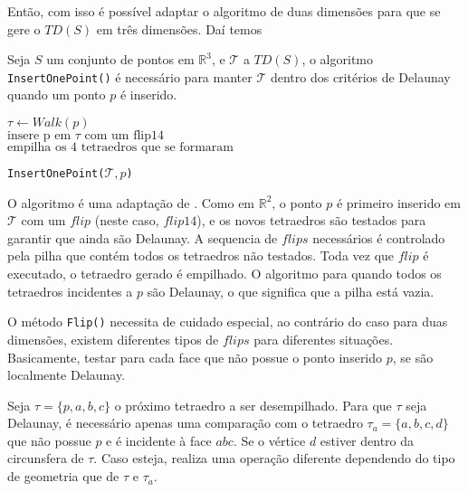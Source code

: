 Então, com isso é possível adaptar o algoritmo de duas dimensões para que 
se gere o $TD(S)$ em três dimensões. Daí temos 
\begin{definicao}
    Seja $S$ um conjunto de pontos em $\mathbb{R}^3$, e $\mathcal{T}$ a $TD(S)$,
    o algoritmo \texttt{InsertOnePoint()} é necessário para manter $\mathcal{T}$
    dentro dos critérios de Delaunay quando um ponto $p$ é inserido.    
\end{definicao}

\begin{algorithm}
\DontPrintSemicolon %
$\tau \gets Walk(p)$\\
$\text{insere p em }\tau\text{ com um flip14}$\\
$\text{empilha os 4 tetraedros que se formaram}$\\
\caption{\texttt{InsertOnePoint($\mathcal{T}, p$)}}
\label{alg1}
\end{algorithm}

O algoritmo é uma adaptação de \cite{Joe1991}. Como em $\mathbb{R}^2$, o ponto $p$
é primeiro inserido em $\mathcal{T}$ com um $flip$ (neste caso, $flip14$), e os 
novos tetraedros são testados para garantir que ainda são Delaunay. A sequencia de 
$flips$ necessários é controlado pela pilha que contém todos os tetraedros não
testados. Toda vez que $flip$ é executado, o tetraedro gerado é empilhado. O algoritmo
para quando todos os tetraedros incidentes a $p$ são Delaunay, o que significa que 
a pilha está vazia.

O método \texttt{Flip()} necessita de cuidado especial, ao contrário do caso para duas
dimensões, existem diferentes tipos de $flips$ para diferentes situações. Basicamente,
testar para cada face que não possue o ponto inserido $p$, se são localmente 
Delaunay.  

Seja $\tau = \{p,a,b,c\}$ o próximo tetraedro a ser desempilhado. Para que 
$\tau$ seja Delaunay, é necessário apenas uma comparação com o tetraedro 
$\tau_a = \{a,b,c,d\}$ que não possue $p$ e é incidente à face $abc$. Se o
vértice $d$ estiver dentro da circunsfera de $\tau$. Caso esteja, realiza
uma operação diferente dependendo do tipo de geometria que de $\tau$ e 
$\tau_a$.

